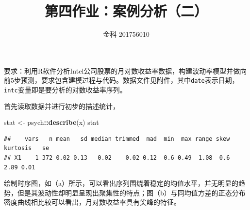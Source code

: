 \documentclass[
]{article}
\title{第四作业：案例分析（二）}
\author{金科 201756010}
\date{}
\newenvironment{Shaded}{\begin{snugshade}}{\end{snugshade}}
\newcommand{\DataTypeTok}[1]{\textcolor[rgb]{0.13,0.29,0.53}{#1}}
\newcommand{\DecValTok}[1]{\textcolor[rgb]{0.00,0.00,0.81}{#1}}
\newcommand{\KeywordTok}[1]{\textcolor[rgb]{0.13,0.29,0.53}{\textbf{#1}}}
\newcommand{\NormalTok}[1]{#1}
\newcommand{\OperatorTok}[1]{\textcolor[rgb]{0.81,0.36,0.00}{\textbf{#1}}}
\newcommand{\OtherTok}[1]{\textcolor[rgb]{0.56,0.35,0.01}{#1}}
\newcommand{\StringTok}[1]{\textcolor[rgb]{0.31,0.60,0.02}{#1}}
\begin{document}
\maketitle

要求：利用R软件分析Intel公司股票的月对数收益率数据，构建波动率模型并做向前5步预测，要求包含建模过程与代码。数据文件见附件，其中\texttt{date}表示日期，\texttt{intc}变量即是要分析的对数收益率序列。

首先读取数据并进行初步的描述统计，

\begin{Shaded}
\end{Shaded}

\begin{Shaded}
\begin{Highlighting}[]
\NormalTok{stat <-}\StringTok{ }\NormalTok{psych}\OperatorTok{::}\KeywordTok{describe}\NormalTok{(x)}
\NormalTok{stat}
\end{Highlighting}
\end{Shaded}

\begin{verbatim}
##    vars   n mean   sd median trimmed  mad  min  max range skew kurtosis   se
## X1    1 372 0.02 0.13   0.02    0.02 0.12 -0.6 0.49  1.08 -0.6     2.89 0.01
\end{verbatim}

绘制时序图，如（a）所示，可以看出序列围绕着稳定的均值水平，并无明显的趋势，但是其波动性却明显呈现出聚集性的特点；图（b）与同均值方差的正态分布密度曲线相比较可以看出，月对数收益率具有尖峰的特征。
\end{document}

